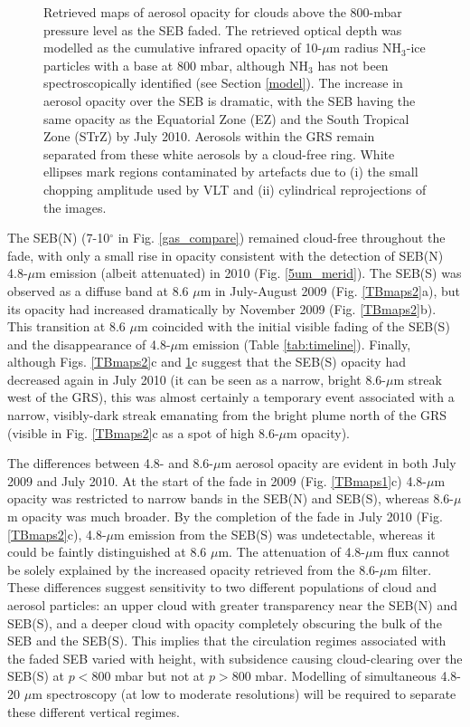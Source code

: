 \documentclass[final,5p,times,twocolumn,authoryear]{elsarticle}
\begin{document}
\begin{figure}[tbp]
\centering
{}
\caption{Retrieved maps of aerosol opacity for clouds above the 800-mbar pressure level as the SEB faded.  The retrieved optical depth was modelled as the cumulative infrared opacity of 10-$\mu$m radius NH$_3$-ice particles with a base at 800 mbar, although NH$_3$ has not been spectroscopically identified (see Section \ref{model}).  The increase in aerosol opacity over the SEB is dramatic, with the SEB having the same opacity as the Equatorial Zone (EZ) and the South Tropical Zone (STrZ) by July 2010.  Aerosols within the GRS remain separated from these white aerosols by a cloud-free ring.   White ellipses mark regions contaminated by artefacts due to (i) the small chopping amplitude used by VLT and (ii) cylindrical reprojections of the images. }
\label{aermaps}
\end{figure}

The SEB(N) (7-10$^\circ$ in Fig. \ref{gas_compare}) remained cloud-free throughout the fade, with only a small rise in opacity consistent with the detection of SEB(N) 4.8-$\mu$m emission (albeit attenuated) in 2010 (Fig. \ref{5um_merid}).  The SEB(S) was observed as a diffuse band at 8.6 $\mu$m in July-August 2009 (Fig. \ref{TBmaps2}a), but its opacity had increased dramatically by November 2009 (Fig. \ref{TBmaps2}b).  This transition at 8.6 $\mu$m coincided with the initial visible fading of the SEB(S) and the disappearance of 4.8-$\mu$m emission (Table \ref{tab:timeline}).  Finally, although Figs. \ref{TBmaps2}c and \ref{aermaps}c suggest that the SEB(S) opacity had decreased again in July 2010 (it can be seen as a narrow, bright 8.6-$\mu$m streak west of the GRS), this was almost certainly a temporary event associated with a narrow, visibly-dark streak emanating from the bright plume north of the GRS (visible in Fig. \ref{TBmaps2}c as a spot of high 8.6-$\mu$m opacity).

The differences between 4.8- and 8.6-$\mu$m aerosol opacity are evident in both July 2009 and July 2010.  At the start of the fade in 2009 (Fig. \ref{TBmaps1}c) 4.8-$\mu$m opacity was restricted to narrow bands in the SEB(N) and SEB(S), whereas 8.6-$\mu$m opacity was much broader.  By the completion of the fade in July 2010 (Fig. \ref{TBmaps2}c), 4.8-$\mu$m emission from the SEB(S) was undetectable, whereas it could be faintly distinguished at 8.6 $\mu$m.  The attenuation of 4.8-$\mu$m flux cannot be solely explained by the increased opacity retrieved from the 8.6-$\mu$m filter.  These differences suggest sensitivity to two different populations of cloud and aerosol particles: an upper cloud with greater transparency near the SEB(N) and SEB(S), and a deeper cloud with opacity completely obscuring the bulk of the SEB and the SEB(S).  This implies that the circulation regimes associated with the faded SEB varied with height, with subsidence causing cloud-clearing over the SEB(S) at $p<800$ mbar but not at $p>800$ mbar.  Modelling of simultaneous 4.8-20 $\mu$m spectroscopy (at low to moderate resolutions) will be required to separate these different vertical regimes.  
\end{document}
